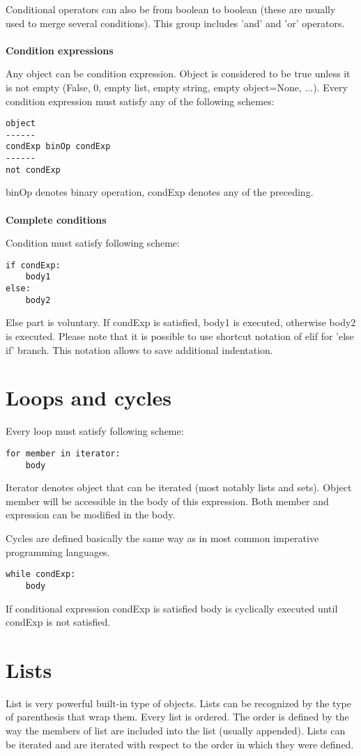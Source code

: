 \documentclass[11pt,oneside]{fithesis2}
\newcommand{\markit}[1]{\ \\\\{\noindent\textbf{#1}}}
\begin{document}
Conditional operators can also be from boolean to boolean (these are usually used to merge several conditions). This group includes 'and' and 'or' operators.
\markit{Condition expressions}

Any object can be condition expression. Object is considered to be true unless it is not empty (False, 0, empty list, empty string, empty object=None, ...). 
Every condition expression must satisfy any of the following schemes:

\begin{lstlisting}
object
------
condExp binOp condExp
------
not condExp
\end{lstlisting}
binOp denotes binary operation, condExp denotes any of the preceding.
\markit{Complete conditions}

Condition must satisfy following scheme:
\begin{lstlisting}
if condExp:
    body1
else:
    body2
\end{lstlisting}
Else part is voluntary. If condExp is satisfied, body1 is executed, otherwise body2 is executed. Please note that it is possible to use shortcut notation of elif for 'else if' branch. This notation allows to save additional indentation.

\section{Loops and cycles}
Every loop must satisfy following scheme:
\begin{lstlisting}
for member in iterator:
    body
\end{lstlisting}
Iterator denotes object that can be iterated (most notably lists and sets). Object member will be accessible in the body of this expression. Both member and expression can be modified in the body.

Cycles are defined basically the same way as in most common imperative programming languages.
\begin{lstlisting}
while condExp:
    body
\end{lstlisting}
If conditional expression condExp is satisfied body is cyclically executed until condExp is not satisfied.

\section{Lists}
List is very powerful built-in type of objects. Lists can be recognized by the type of parenthesis that wrap them. Every list is ordered. The order is defined by the way the members of list are included into the list (usually appended). Lists can be iterated and are iterated with respect to the order in which they were defined.
\end{document}
